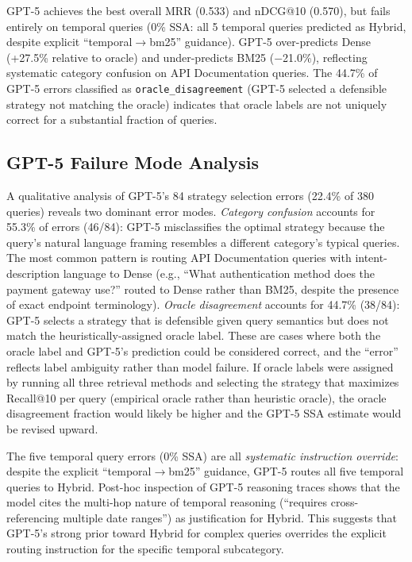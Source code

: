 \documentclass[11pt, a4paper]{article}
\begin{document}
GPT-5 achieves the best overall MRR (0.533) and nDCG@10 (0.570), but fails entirely on temporal queries (0\% SSA: all 5 temporal queries predicted as Hybrid, despite explicit ``temporal$\to$bm25'' guidance). GPT-5 over-predicts Dense (+27.5\% relative to oracle) and under-predicts BM25 ($-$21.0\%), reflecting systematic category confusion on API Documentation queries. The 44.7\% of GPT-5 errors classified as \texttt{oracle\_disagreement} (GPT-5 selected a defensible strategy not matching the oracle) indicates that oracle labels are not uniquely correct for a substantial fraction of queries.

\subsection{GPT-5 Failure Mode Analysis}

A qualitative analysis of GPT-5's 84 strategy selection errors (22.4\% of 380 queries) reveals two dominant error modes. \emph{Category confusion} accounts for 55.3\% of errors (46/84): GPT-5 misclassifies the optimal strategy because the query's natural language framing resembles a different category's typical queries. The most common pattern is routing API Documentation queries with intent-description language to Dense (e.g., ``What authentication method does the payment gateway use?'' routed to Dense rather than BM25, despite the presence of exact endpoint terminology). \emph{Oracle disagreement} accounts for 44.7\% (38/84): GPT-5 selects a strategy that is defensible given query semantics but does not match the heuristically-assigned oracle label. These are cases where both the oracle label and GPT-5's prediction could be considered correct, and the ``error'' reflects label ambiguity rather than model failure. If oracle labels were assigned by running all three retrieval methods and selecting the strategy that maximizes Recall@10 per query (empirical oracle rather than heuristic oracle), the oracle disagreement fraction would likely be higher and the GPT-5 SSA estimate would be revised upward.

The five temporal query errors (0\% SSA) are all \emph{systematic instruction override}: despite the explicit ``temporal$\to$bm25'' guidance, GPT-5 routes all five temporal queries to Hybrid. Post-hoc inspection of GPT-5 reasoning traces shows that the model cites the multi-hop nature of temporal reasoning (``requires cross-referencing multiple date ranges'') as justification for Hybrid. This suggests that GPT-5's strong prior toward Hybrid for complex queries overrides the explicit routing instruction for the specific temporal subcategory.
\end{document}
